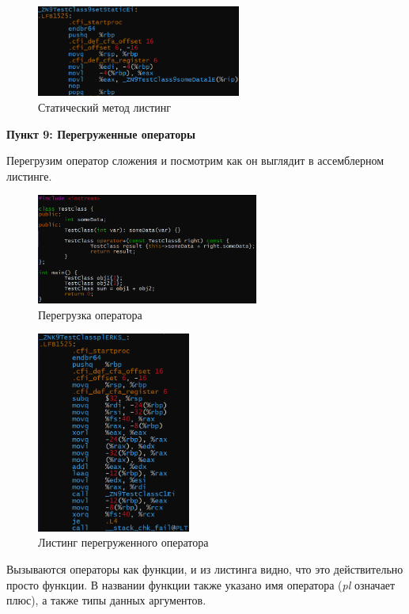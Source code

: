 \documentclass[a4paper,12pt]{article}
\begin{document}
\begin{figure}[H]\label{fig: Статический методы листинг}
    \centering
    \includegraphics[width = 0.6\textwidth]{Статический метод листинг.png}
    \caption{Статический метод листинг}
\end{figure}
\newpage

\textbf{Пункт 9: Перегруженные операторы}

Перегрузим оператор сложения и посмотрим как он выглядит в ассемблерном листинге.
\begin{figure}[H]\label{fig: Оператор сложения код}
    \centering
    \includegraphics[width = 0.65\textwidth]{Оператор сложения код.png}
    \caption{Перегрузка оператора}
\end{figure}
\begin{figure}[H]\label{fig: Оператор сложения листинг}
    \centering
    \includegraphics[width = 0.45\textwidth]{Оператор сложения листинг.png}
    \caption{Листинг перегруженного оператора}
\end{figure}
Вызываются операторы как функции, и из листинга видно, что это действительно просто функции. В названии функции также указано имя оператора (\textit{pl} означает плюс), а также типы данных аргументов.
\newpage
\end{document}
